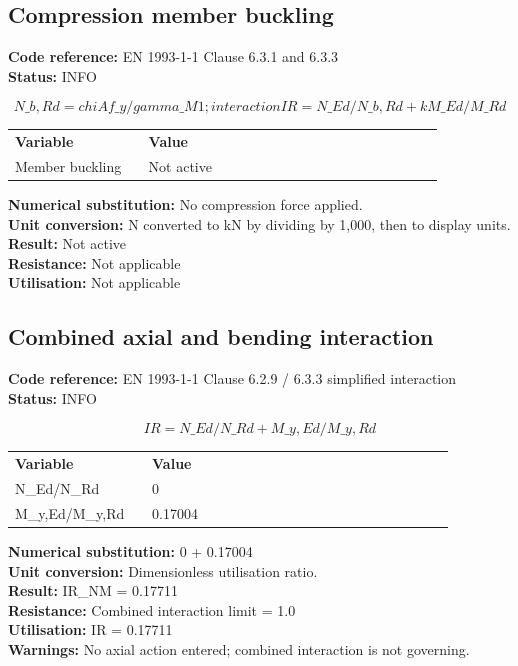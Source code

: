 \documentclass[11pt,a4paper]{article}
\begin{document}
\subsection{Compression member buckling}
\textbf{Code reference:} EN 1993-1-1 Clause 6.3.1 and 6.3.3\\
\textbf{Status:} INFO

\[
N\_b,Rd = chi A f\_y / gamma\_M1; interaction IR = N\_Ed/N\_b,Rd + k M\_Ed/M\_Rd
\]

\begin{longtable}{p{0.28\linewidth}p{0.62\linewidth}}
\textbf{Variable} & \textbf{Value} \\
Member buckling & Not active \\
\end{longtable}

\textbf{Numerical substitution:} No compression force applied.\\
\textbf{Unit conversion:} N converted to kN by dividing by 1,000, then to display units.\\
\textbf{Result:} Not active\\
\textbf{Resistance:} Not applicable\\
\textbf{Utilisation:} Not applicable\\


\subsection{Combined axial and bending interaction}
\textbf{Code reference:} EN 1993-1-1 Clause 6.2.9 / 6.3.3 simplified interaction\\
\textbf{Status:} INFO

\[
IR = N\_Ed/N\_Rd + M\_y,Ed/M\_y,Rd
\]

\begin{longtable}{p{0.28\linewidth}p{0.62\linewidth}}
\textbf{Variable} & \textbf{Value} \\
N\_Ed/N\_Rd & 0 \\
M\_y,Ed/M\_y,Rd & 0.17004 \\
\end{longtable}

\textbf{Numerical substitution:} 0 + 0.17004\\
\textbf{Unit conversion:} Dimensionless utilisation ratio.\\
\textbf{Result:} IR\_NM = 0.17711\\
\textbf{Resistance:} Combined interaction limit = 1.0\\
\textbf{Utilisation:} IR = 0.17711\\
\textbf{Warnings:} No axial action entered; combined interaction is not governing.
\end{document}
